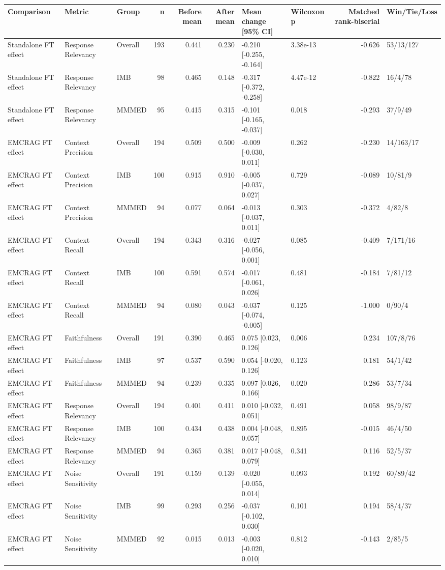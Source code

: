 \begin{tabular}{lllrrrllrl}
\toprule
Comparison & Metric & Group & n & Before mean & After mean & Mean change [95\% CI] & Wilcoxon p & Matched rank-biserial & Win/Tie/Loss \\
\midrule
Standalone FT effect & Response Relevancy & Overall & 193 & 0.441 & 0.230 & -0.210 [-0.255, -0.164] & 3.38e-13 & -0.626 & 53/13/127 \\
Standalone FT effect & Response Relevancy & IMB & 98 & 0.465 & 0.148 & -0.317 [-0.372, -0.258] & 4.47e-12 & -0.822 & 16/4/78 \\
Standalone FT effect & Response Relevancy & MMMED & 95 & 0.415 & 0.315 & -0.101 [-0.165, -0.037] & 0.018 & -0.293 & 37/9/49 \\
EMCRAG FT effect & Context Precision & Overall & 194 & 0.509 & 0.500 & -0.009 [-0.030, 0.011] & 0.262 & -0.230 & 14/163/17 \\
EMCRAG FT effect & Context Precision & IMB & 100 & 0.915 & 0.910 & -0.005 [-0.037, 0.027] & 0.729 & -0.089 & 10/81/9 \\
EMCRAG FT effect & Context Precision & MMMED & 94 & 0.077 & 0.064 & -0.013 [-0.037, 0.011] & 0.303 & -0.372 & 4/82/8 \\
EMCRAG FT effect & Context Recall & Overall & 194 & 0.343 & 0.316 & -0.027 [-0.056, 0.001] & 0.085 & -0.409 & 7/171/16 \\
EMCRAG FT effect & Context Recall & IMB & 100 & 0.591 & 0.574 & -0.017 [-0.061, 0.026] & 0.481 & -0.184 & 7/81/12 \\
EMCRAG FT effect & Context Recall & MMMED & 94 & 0.080 & 0.043 & -0.037 [-0.074, -0.005] & 0.125 & -1.000 & 0/90/4 \\
EMCRAG FT effect & Faithfulness & Overall & 191 & 0.390 & 0.465 & 0.075 [0.023, 0.126] & 0.006 & 0.234 & 107/8/76 \\
EMCRAG FT effect & Faithfulness & IMB & 97 & 0.537 & 0.590 & 0.054 [-0.020, 0.126] & 0.123 & 0.181 & 54/1/42 \\
EMCRAG FT effect & Faithfulness & MMMED & 94 & 0.239 & 0.335 & 0.097 [0.026, 0.166] & 0.020 & 0.286 & 53/7/34 \\
EMCRAG FT effect & Response Relevancy & Overall & 194 & 0.401 & 0.411 & 0.010 [-0.032, 0.051] & 0.491 & 0.058 & 98/9/87 \\
EMCRAG FT effect & Response Relevancy & IMB & 100 & 0.434 & 0.438 & 0.004 [-0.048, 0.057] & 0.895 & -0.015 & 46/4/50 \\
EMCRAG FT effect & Response Relevancy & MMMED & 94 & 0.365 & 0.381 & 0.017 [-0.048, 0.079] & 0.341 & 0.116 & 52/5/37 \\
EMCRAG FT effect & Noise Sensitivity & Overall & 191 & 0.159 & 0.139 & -0.020 [-0.055, 0.014] & 0.093 & 0.192 & 60/89/42 \\
EMCRAG FT effect & Noise Sensitivity & IMB & 99 & 0.293 & 0.256 & -0.037 [-0.102, 0.030] & 0.101 & 0.194 & 58/4/37 \\
EMCRAG FT effect & Noise Sensitivity & MMMED & 92 & 0.015 & 0.013 & -0.003 [-0.020, 0.010] & 0.812 & -0.143 & 2/85/5 \\
\bottomrule
\end{tabular}

